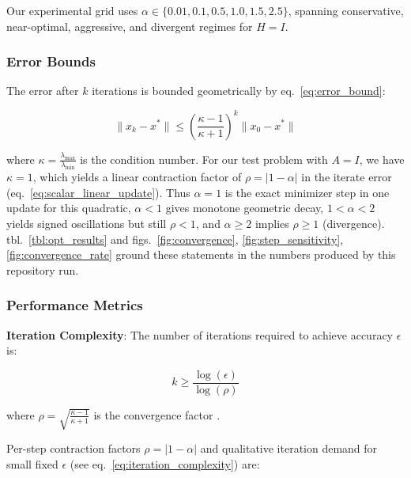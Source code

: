 \documentclass[
]{article}
\begin{document}
Our experimental grid uses
\(\alpha \in \{0.01, 0.1, 0.5, 1.0, 1.5, 2.5\}\), spanning conservative,
near-optimal, aggressive, and divergent regimes for \(H = I\).

\subsubsection{Error Bounds}\label{error-bounds}

The error after \(k\) iterations is bounded geometrically by
eq.~\ref{eq:error_bound}:

\begin{equation}
\label{eq:error_bound}
\|x_k - x^*\| \leq \left(\frac{\kappa - 1}{\kappa + 1}\right)^k \|x_0 - x^*\|
\end{equation}

where \(\kappa = \frac{\lambda_{\max}}{\lambda_{\min}}\) is the
condition number. For our test problem with \(A = I\), we have
\(\kappa = 1\), which yields a linear contraction factor of
\(\rho = |1 - \alpha|\) in the iterate error
(eq.~\ref{eq:scalar_linear_update}). Thus \(\alpha = 1\) is the exact
minimizer step in one update for this quadratic, \(\alpha < 1\) gives
monotone geometric decay, \(1 < \alpha < 2\) yields signed oscillations
but still \(\rho < 1\), and \(\alpha \geq 2\) implies \(\rho \geq 1\)
(divergence). tbl.~\ref{tbl:opt_results} and
figs.~\ref{fig:convergence}, \ref{fig:step_sensitivity}, \ref{fig:convergence_rate}
ground these statements in the numbers produced by this repository run.

\subsubsection{Performance Metrics}\label{performance-metrics}

\textbf{Iteration Complexity}: The number of iterations required to
achieve accuracy \(\epsilon\) is:

\begin{equation}
\label{eq:iteration_complexity}
k \geq \frac{\log(\epsilon)}{\log(\rho)}
\end{equation}

where \(\rho = \sqrt{\frac{\kappa - 1}{\kappa + 1}}\) is the convergence
factor \citep{polyak1964some}.

Per-step contraction factors \(\rho = |1-\alpha|\) and qualitative
iteration demand for small fixed \(\epsilon\) (see
eq.~\ref{eq:iteration_complexity}) are:
\end{document}

